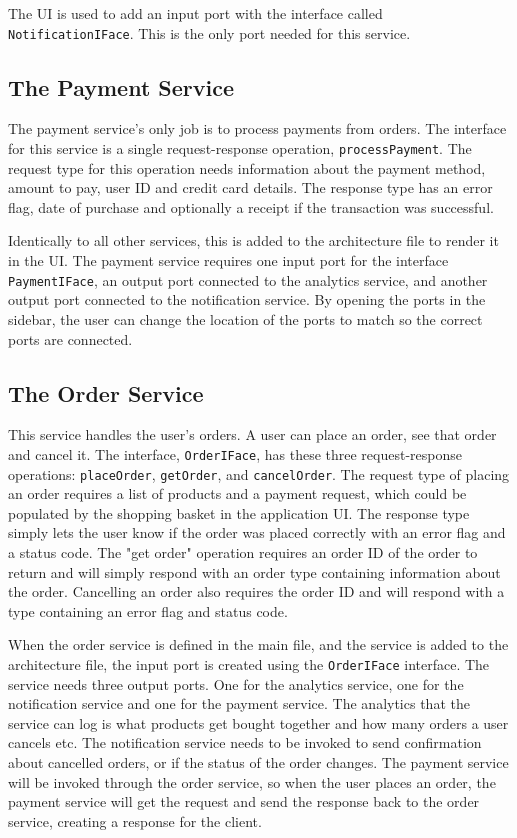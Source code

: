 The UI is used to add an input port with the interface called \texttt{NotificationIFace}. This is the only port needed for this service.

\subsection{The Payment Service}
The payment service's only job is to process payments from orders. The interface for this service is a single request-response operation, \texttt{processPayment}.
The request type for this operation needs information about the payment method, amount to pay, user ID and credit card details. The response type has an error flag, date of purchase and optionally a receipt if the transaction was successful.

Identically to all other services, this is added to the architecture file to render it in the UI. The payment service requires one input port for the interface \texttt{PaymentIFace}, an output port connected to the analytics service, and another output port connected to the notification service.
By opening the ports in the sidebar, the user can change the location of the ports to match so the correct ports are connected.

\subsection{The Order Service}
This service handles the user's orders. A user can place an order, see that order and cancel it. The interface, \texttt{OrderIFace}, has these three request-response operations: \texttt{placeOrder}, \texttt{getOrder}, and \texttt{cancelOrder}.
The request type of placing an order requires a list of products and a payment request, which could be populated by the shopping basket in the application UI.
The response type simply lets the user know if the order was placed correctly with an error flag and a status code. The "get order" operation requires an order ID of the order to return and will simply respond with an order type containing information about the order.
Cancelling an order also requires the order ID and will respond with a type containing an error flag and status code.

When the order service is defined in the main file, and the service is added to the architecture file, the input port is created using the \texttt{OrderIFace} interface.
The service needs three output ports. One for the analytics service, one for the notification service and one for the payment service. The analytics that the service can log is what products get bought together and how many orders a user cancels etc.
The notification service needs to be invoked to send confirmation about cancelled orders, or if the status of the order changes.
The payment service will be invoked through the order service, so when the user places an order, the payment service will get the request and send the response back to the order service, creating a response for the client.

